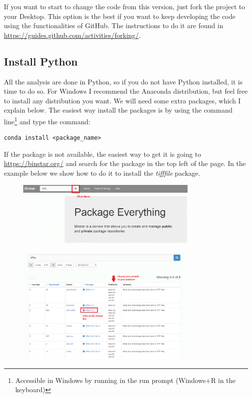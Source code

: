 \documentclass[12pt]{article}
\begin{document}
If you want to start to change the code from this version, just fork the project to your Desktop. This option is the best if you want to keep developing the code using the functionalities of GitHub. The instructions to do it are found in \url{https://guides.github.com/activities/forking/}.

\subsection{Install Python}

All the analysis are done in Python, so if you do not have Python installed, it is time to do so. For Windows I recommend the Anaconda distribution, but feel free to install any distribution you want. We will need some extra packages, which I explain below. The easiest way install the packages is by using the command line\footnote{Accessible in Windows by running  in the run prompt (Windows+R in the keyboard)} and type the command:

\begin{verbatim}
conda install <package_name>
\end{verbatim}

If the package is not available, the easiest way to get it is going to \url{https://binstar.org/} and search for the package in the top left of the page. In the example below we show how to do it to install the \textit{tifffile} package.

\begin{figure}[h]
\centering
\includegraphics[width=0.8\textwidth]{binstar_search.png}
\end{figure}

\begin{figure}[h]
\centering
\includegraphics[width=0.8\textwidth]{binstar_package.png}
\end{figure}
\end{document}
